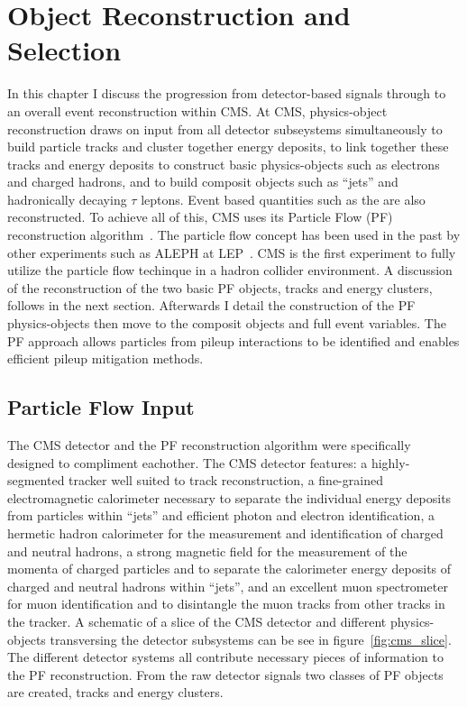 \chapter{Object Reconstruction and Selection}

In this chapter I discuss the progression from detector-based signals through to an
overall event reconstruction within CMS. At CMS, physics-object reconstruction draws
on input from all detector subseystems simultaneously to build particle tracks
and cluster together energy deposits, to link together these tracks and energy
deposits to construct basic physics-objects such as electrons and charged
hadrons, and to build composit objects such as ``jets'' and hadronically decaying
$\tau$ leptons. Event based quantities such as the \etvecmiss are also reconstructed.
To achieve all of this, CMS uses its Particle Flow (PF) reconstruction 
algorithm~\cite{Sirunyan:2017ulk}. The particle flow concept has been used in the 
past by other experiments such as ALEPH at LEP~\cite{PF-ALEPH}. CMS is the first
experiment to fully utilize the particle flow techinque in a hadron collider environment.
A discussion of the reconstruction of the two basic PF objects, tracks and energy
clusters, follows in the next section. Afterwards I detail the construction of 
the PF physics-objects then move to the composit objects and full event variables.
The PF approach allows particles from pileup interactions to be identified 
and enables efficient pileup mitigation methods.

\section{Particle Flow Input}
The CMS detector and the PF reconstruction algorithm were specifically designed to
compliment eachother. The CMS detector features: a highly-segmented tracker well
suited to track reconstruction, a fine-grained electromagnetic calorimeter necessary
to separate the individual energy deposits from particles within ``jets'' and
efficient photon and electron identification, a hermetic hadron 
calorimeter for the measurement and identification of charged and neutral hadrons, 
a strong magnetic field for the measurement of the momenta of charged particles and to
separate the calorimeter energy deposits of charged and neutral hadrons within ``jets'', and 
an excellent muon spectrometer for muon identification and to disintangle the muon
tracks from other tracks in the tracker. A schematic of a slice of the CMS detector
and different physics-objects transversing the detector subsystems can be see in
figure~\ref{fig:cms_slice}. The different detector systems all contribute
necessary pieces of information to the PF reconstruction. From the raw detector
signals two classes of PF objects are created, tracks and energy clusters.

